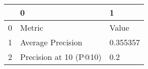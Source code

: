 \begin{tabular}{lll}
\toprule
{} &                       0 &         1 \\
\midrule
0 &                  Metric &     Value \\
1 &       Average Precision &  0.355357 \\
2 &  Precision at 10 (P@10) &       0.2 \\
\bottomrule
\end{tabular}
